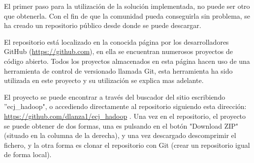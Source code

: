 El primer paso para la utilización de la solución implementada, no puede ser otro que obtenerla. Con el fin de que la comunidad pueda conseguirla sin problema, se ha creado un repositorio p\'ublico desde donde se puede descargar.

El repositorio est\'a localizado en la conocida p\'agina por los desarrolladores GitHub (\url{https://github.com}), en ella se encuentran numerosos proyectos de código abierto. Todos los proyectos almacenados en esta p\'agina hacen uso de una herramienta de control de versionado llamada Git, esta herramienta ha sido utilizada en este proyecto y su utilizaci\'on se explica mas adelante.


El proyecto se puede encontrar a través del buscador del sitio escribiendo ''ecj\_hadoop", o accediendo directamente al repositorio siguiendo esta dirección: \url{https://github.com/dlanza1/ecj_hadoop} . Una vez en el repositorio, el proyecto se puede obtener de dos formas, una es pulsando en el botón "Download ZIP" (situado en la columna de la derecha), y una vez descargado descomprimir el fichero, y la otra forma es clonar el repositorio con Git (crear un repositorio igual de forma local).

